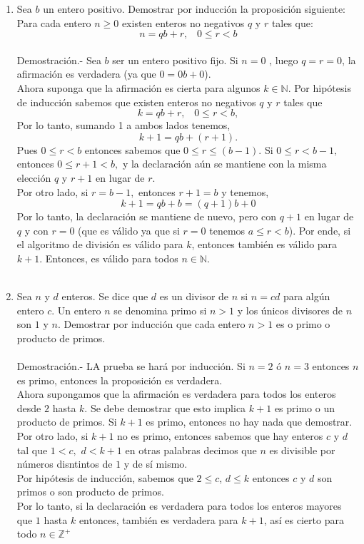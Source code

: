 \begin{enumerate}
\item Sea $b$ un entero positivo. Demostrar por inducción la proposición siguiente: Para cada entero $n\geq 0$ existen enteros no negativos $q$ \; y \; $r$ tales que:
$$n=qb+r, \; \; \; 0\leq r < b$$ \\
Demostración.- \; Sea $b$ ser un entero positivo fijo. Si $n=0$ , luego $q=r=0$, la afirmación es verdadera (ya que $0=0b+0$).\\
Ahora suponga que la afirmación es cierta para algunos $k \in \mathbb{N}$. Por hipótesis de inducción sabemos que existen enteros no negativos $q$ \; y \; $r$ tales que $$k=qb+r, \; \; \; 0\leq r < b,$$ Por lo tanto, sumando 1 a ambos lados tenemos, $$k+1=qb+(r+1).$$ Pues $0\leq r < b$ entonces sabemos que $0\leq r \leq (b-1)$. Si $0\leq r < b-1,$ entonces $0\leq r+1<b,$ y la declaración aún se mantiene con la misma elección $q$ \; y \; $r+1$ en lugar de $r$.\\
Por otro lado, si $r=b-1,$ entonces $r+1=b$ y tenemos, $$k+1=qb+b=(q+1)b+0$$
Por lo tanto, la declaración se mantiene de nuevo, pero con $q+1$ en lugar de $q$ \; y con $r=0$ (que es válido ya que si $r=0$ tenemos $a\leq r < b$). Por ende, si el algoritmo de división es válido para $k$, entonces también es válido para $k+1.$ Entonces, es válido para todos $n \in \mathbb{N}$.\\\\

\item Sea $n$ \; y \; $d$ enteros. Se dice que $d$ es un divisor de $n$ si $n=cd$ para algún entero $c$. Un entero $n$ se denomina primo si $n>1$ y los únicos divisores de $n$ son $1$ \; y \; $n$. Demostrar por inducción que cada entero $n>1$ es o primo o producto de primos.\\\\
Demostración.- \; LA prueba se hará por inducción. Si $n=2$ ó $n=3$ entonces $n$ es primo, entonces la proposición es verdadera.\\
Ahora supongamos que la afirmación es verdadera para todos los enteros desde $2$ hasta $k$. Se debe demostrar que esto implica $k+1$ es primo o un producto de primos. Si $k+1$ es primo, entonces no hay nada que demostrar. Por otro lado, si $k+1$ no es primo, entonces sabemos que hay enteros $c$ \; y \; $d$ tal que $1<c,$ $d<k+1$ en otras palabras decimos que $n$ es divisible por números disntintos de $1$ y de sí mismo.\\
Por hipótesis de inducción, sabemos que $2\leq c$, $d\leq k$ entonces $c$ \; y \; $d$ son primos o son producto de primos.\\
Por lo tanto, si la declaración es verdadera para todos los enteros mayores que $1$ hasta $k$ entonces, también es verdadera para $k+1$, así es cierto para todo $n\in \mathbb{Z}^+$\\\\


\end{enumerate}
